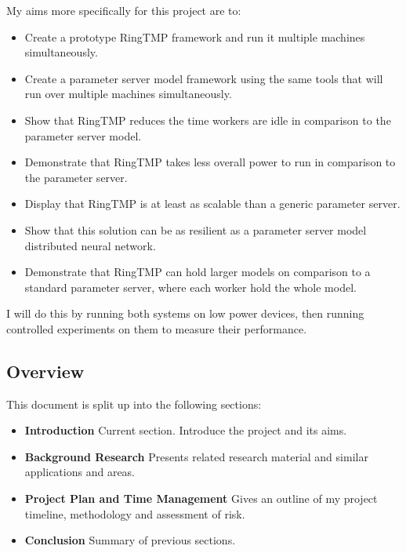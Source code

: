 My aims more specifically for this project are to:
\begin{itemize}
    \item Create a prototype RingTMP framework and run it multiple machines
    simultaneously.
    \item Create a parameter server model framework using the same tools that
    will run over multiple machines simultaneously.
    \item Show that RingTMP reduces the time workers are idle in comparison to
    the parameter server model.
    \item Demonstrate that RingTMP takes less overall power to run in comparison
    to the parameter server.
    \item Display that RingTMP is at least as scalable than a generic parameter
    server.
    \item Show that this solution can be as resilient as a parameter server
    model distributed neural network.
    \item Demonstrate that RingTMP can hold larger models on comparison to a
    standard parameter server, where each worker hold the whole model.
\end{itemize}
I will do this by running both systems on low power devices, then running
controlled experiments on them to measure their performance.



\subsection{Overview}
This document is split up into the following sections:
\begin{itemize}
 \item \textbf{Introduction} Current section. Introduce the project and its aims.
 \item \textbf{Background Research} Presents related research material and similar applications and areas.
 \item \textbf{Project Plan and Time Management} Gives an outline of my project timeline, methodology and assessment of risk.
 \item \textbf{Conclusion} Summary of previous sections.
\end{itemize}

